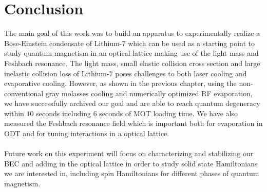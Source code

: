 \chapter{Conclusion}

The main goal of this work was to build an apparatus to experimentally realize a Bose-Einstein condensate of Lithium-$7$ which can be used as a starting point to study quantum magnetism in an optical lattice making use of the light mass and Feshbach resonance. The light mass, small elastic collision cross section and large inelastic collision loss of Lithium-$7$ poses challenges to both laser cooling and evaporative cooling. However, as shown in the previous chapter, using the non-conventional gray molasses cooling and numerically optimized RF evaporation, we have successfully archived our goal and are able to reach quantum degeneracy within $10$ seconds including $6$ seconds of MOT loading time. We have also measured the Feshbach resonance field which is important both for evaporation in ODT and for tuning interactions in a optical lattice.\\
\\
Future work on this experiment will focus on characterizing and stabilizing our BEC and adding in the optical lattice in order to study solid state Hamiltonians we are interested in, including spin Hamiltonians for different phases of quantum magnetism.
